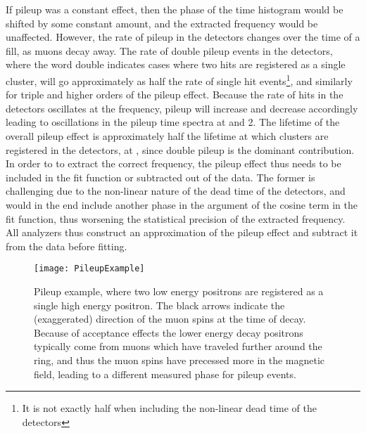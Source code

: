 If pileup was a constant effect, then the phase of the time histogram would be shifted by some constant amount, and the extracted \wa frequency would be unaffected. However, the rate of pileup in the detectors changes over the time of a fill, as muons decay away. The rate of double pileup events in the detectors, where the word double indicates cases where two hits are registered as a single cluster, will go approximately as half the rate of single hit events\footnote{It is not exactly half when including the non-linear dead time of the detectors}, and similarly for triple and higher orders of the pileup effect. Because the rate of hits in the detectors oscillates at the \gmtwo frequency, pileup will increase and decrease accordingly leading to oscillations in the pileup time spectra at \wa and 2\wa. The lifetime of the overall pileup effect is approximately half the lifetime at which clusters are registered in the detectors, at \taumu, since double pileup is the dominant contribution. In order to to extract the correct \wa frequency, the pileup effect thus needs to be included in the fit function or subtracted out of the data. The former is challenging due to the non-linear nature of the dead time of the detectors, and would in the end include another phase in the argument of the cosine term in the fit function, thus worsening the statistical precision of the extracted \wa frequency. All analyzers thus construct an approximation of the pileup effect and subtract it from the data before fitting.




\begin{figure}[]
    \centering
    \texttt{[image: PileupExample]}
    \caption[Pileup example]{Pileup example, where two low energy positrons are registered as a single high energy positron. The black arrows indicate the (exaggerated) direction of the muon spins at the time of decay. Because of acceptance effects the lower energy decay positrons typically come from muons which have traveled further around the ring, and thus the muon spins have precessed more in the magnetic field, leading to a different measured \gmtwo phase for pileup events.}
    \label{fig:PileupExample}
\end{figure}



